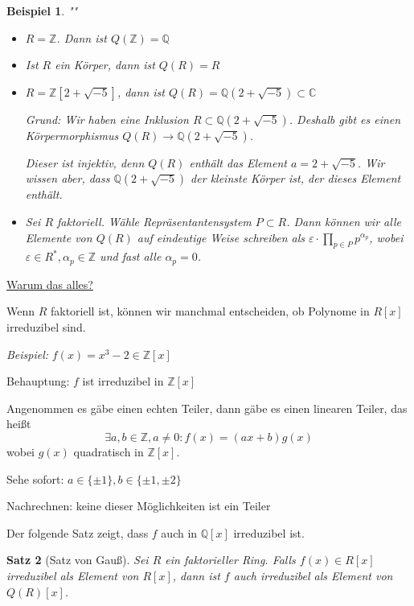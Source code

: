 \documentclass[a4paper,12pt,numbers=noenddot,parskip=full]{scrartcl}
\newcommand{\setZ}{\mathbb{Z}}
\newcommand{\setQ}{\mathbb{Q}}
\newcommand{\setC}{\mathbb{C}}
\newcommand{\heading}{\underline}
\theoremstyle{dotless}
\newtheorem{theorem}{Satz}[section]
\newtheorem{example}[theorem]{Beispiel}
\theoremstyle{remark}
\begin{document}
	\begin{example}""
		\begin{itemize}
			\item $R = \setZ$. Dann ist $Q(\setZ) = \setQ$
			\item Ist $R$ ein Körper, dann ist $Q(R) = R$
			\item $R = \setZ[2 + \sqrt{-5}]$, dann ist $Q(R) = \setQ(2 + \sqrt{-5}) \subset \setC$
			
			Grund: Wir haben eine Inklusion $R \subset \setQ(2 + \sqrt{-5})$. Deshalb gibt es einen Körpermorphismus $Q(R) \to \setQ(2 + \sqrt{-5})$.
			
			Dieser ist injektiv, denn $Q(R)$ enthält das Element $a = 2 + \sqrt{-5}$. Wir wissen aber, dass $\setQ(2 + \sqrt{-5})$ der kleinste Körper ist, der dieses Element enthält.
			\item Sei $R$ faktoriell. Wähle Repräsentantensystem $P \subset R$. Dann können wir alle Elemente von $Q(R)$ auf eindeutige Weise schreiben als
			$
				\varepsilon \cdot \prod_{p \in P} p^{\alpha_p}
			$,
			wobei $\varepsilon \in R^*, \alpha_p \in \setZ$ und fast alle $\alpha_p = 0$.
		\end{itemize}
	\end{example}

	\heading{Warum das alles?}
	
	Wenn $R$ faktoriell ist, können wir manchmal entscheiden, ob Polynome in $R[x]$ irreduzibel sind.
	
	\textit{Beispiel:} $f(x) = x^3 - 2 \in \setZ[x]$
	
	Behauptung: $f$ ist irreduzibel in $\setZ[x]$
	
	Angenommen es gäbe einen echten Teiler, dann gäbe es einen linearen Teiler, das heißt
	\begin{equation*}
		\exists a,b \in \setZ, a \neq 0: f(x) = (ax + b) g(x)
	\end{equation*}
	wobei $g(x)$ quadratisch in $\setZ[x]$.
	
	Sehe sofort: $a \in \{ \pm 1 \}, b \in \{ \pm 1, \pm 2 \}$
	
	Nachrechnen: keine dieser Möglichkeiten ist ein Teiler
	
	Der folgende Satz zeigt, dass $f$ auch in $\setQ[x]$ irreduzibel ist.
	
	\begin{theorem}[Satz von Gauß]
		Sei $R$ ein faktorieller Ring. Falls $f(x) \in R[x]$ irreduzibel als Element von $R[x]$, dann ist $f$ auch irreduzibel als Element von $Q(R)[x]$.
	\end{theorem}
\end{document}
